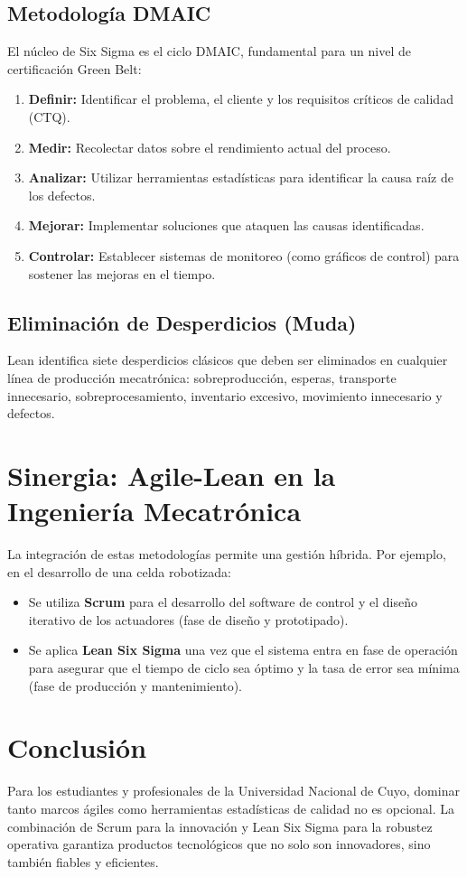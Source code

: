 \documentclass[runningheads]{llncs}
\begin{document}
\subsection{Metodología DMAIC}
El núcleo de Six Sigma es el ciclo DMAIC, fundamental para un nivel de certificación Green Belt:
\begin{enumerate}
    \item \textbf{Definir:} Identificar el problema, el cliente y los requisitos críticos de calidad (CTQ).
    \item \textbf{Medir:} Recolectar datos sobre el rendimiento actual del proceso.
    \item \textbf{Analizar:} Utilizar herramientas estadísticas para identificar la causa raíz de los defectos.
    \item \textbf{Mejorar:} Implementar soluciones que ataquen las causas identificadas.
    \item \textbf{Controlar:} Establecer sistemas de monitoreo (como gráficos de control) para sostener las mejoras en el tiempo.
\end{enumerate}

\subsection{Eliminación de Desperdicios (Muda)}
Lean identifica siete desperdicios clásicos que deben ser eliminados en cualquier línea de producción mecatrónica: sobreproducción, esperas, transporte innecesario, sobreprocesamiento, inventario excesivo, movimiento innecesario y defectos.

\section{Sinergia: Agile-Lean en la Ingeniería Mecatrónica}
La integración de estas metodologías permite una gestión híbrida. Por ejemplo, en el desarrollo de una celda robotizada:
\begin{itemize}
    \item Se utiliza \textbf{Scrum} para el desarrollo del software de control y el diseño iterativo de los actuadores (fase de diseño y prototipado).
    \item Se aplica \textbf{Lean Six Sigma} una vez que el sistema entra en fase de operación para asegurar que el tiempo de ciclo sea óptimo y la tasa de error sea mínima (fase de producción y mantenimiento).
\end{itemize}

\section{Conclusión}
Para los estudiantes y profesionales de la Universidad Nacional de Cuyo, dominar tanto marcos ágiles como herramientas estadísticas de calidad no es opcional. La combinación de Scrum para la innovación y Lean Six Sigma para la robustez operativa garantiza productos tecnológicos que no solo son innovadores, sino también fiables y eficientes.
\end{document}
